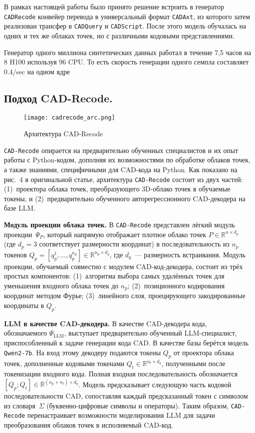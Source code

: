 В рамках настоящей работы было принято решение встроить в генератор
\texttt{CADRecode} конвейер перевода в универсальный формат \texttt{CADAxt}, из
которого затем реализован трансфер в \texttt{CADQuery} и
\texttt{CADScript}. После этого модель обучалась на одних и тех же облаках точек,
но с различными кодовыми представлениями.

Генератор одного миллиона синтетических данных работал в течение 7,5 часов на 8 H100
используя 96 CPU. То есть скорость генерации одного семпла составляет 0.4/sec на одном ядре

\subsection{Подход CAD-Recode.}

\begin{figure}[h!]
    \centering
    \texttt{[image: cadrecode\_arc.png]}
    \caption{Архитектура CAD-Recode}
    \label{fig:cadrecode_arc}
\end{figure}

\texttt{CAD-Recode} опирается на предварительно обученных специалистов и их опыт
работы с Python-кодом, дополняя их возможностями по обработке облаков точек, а
также знаниями, специфичными для CAD-кода на Python. Как показано на рис.~4 в
оригинальной статье, архитектура \texttt{CAD-Recode} состоит из двух частей:
(1)~проектора облака точек, преобразующего 3D-облако точек в обучаемые токены, и
(2)~предварительно обученного авторегрессионного CAD-декодера на базе LLM.

\textbf{Модуль проекции облака точек.} В \texttt{CAD-Recode} представлен лёгкий
модуль проекции~$\Psi_P$, который напрямую отображает плотное облако точек
$P \in \mathbb{R}^{n \times d_p}$ (где $d_p = 3$ соответствует размерности
координат) в последовательность из $n_p$ токенов $Q_p = [q^1_p, \dots, q^{n_p}_p]
    \in \mathbb{R}^{n_p \times d_q}$, где $d_q$~--- размерность встраивания. Модуль
проекции, обучаемый совместно с модулем CAD-код-декодера, состоит из трёх простых
компонентов: (1)~алгоритма выбора самых удалённых точек для уменьшения входного
облака точек до $n_p$; (2)~позиционного кодирования координат методом Фурье;
(3)~линейного слоя, проецирующего закодированные координаты в $Q_p$.

\textbf{LLM в качестве CAD-декодера.} В качестве CAD-декодера кода, обозначаемого
$\Psi_{\text{LLM}}$, выступает предварительно обученный LLM-специалист,
приспособленный к задаче генерации кода CAD. В качестве базы берётся модель
\texttt{Qwen2-7b}. На вход этому декодеру подаются токены $Q_p$ от проектора облака точек,
дополненные кодовыми токенами $Q_t \in \mathbb{R}^{n_t \times d_q}$,
полученными после токенизации входного кода. Полная
входная последовательность обозначается $[Q_p; Q_t] \in
    \mathbb{R}^{(n_p + n_t) \times d_q}$. Модель предсказывает следующую часть
кодовой последовательности CAD, сопоставляя каждый предсказанный токен с
символом из словаря~$\Sigma$ (буквенно-цифровые символы и операторы). Таким
образом, \texttt{CAD-Recode} перенастраивает возможности моделирования LLM для
задачи преобразования облаков точек в исполняемый CAD-код.

